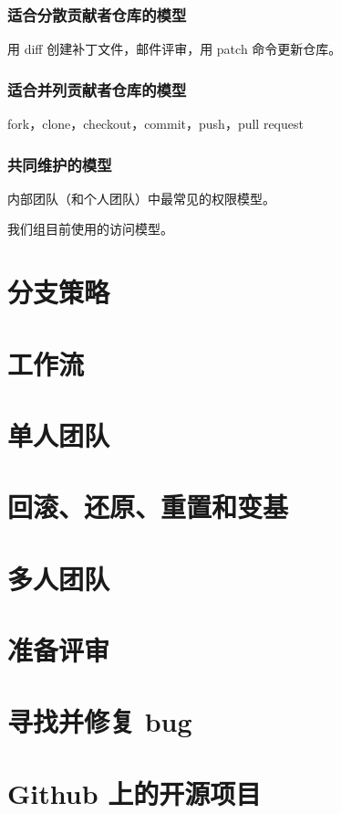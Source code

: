 \documentclass[cn,pad,11pt,green,geye]{../elegantnote}
\begin{document}
\subsubsection{适合分散贡献者仓库的模型}
用 diff 创建补丁文件，邮件评审，用 patch 命令更新仓库。

\subsubsection{适合并列贡献者仓库的模型}
fork，clone，checkout，commit，push，pull request

\subsubsection{共同维护的模型}
内部团队（和个人团队）中最常见的权限模型。

我们组目前使用的访问模型。

\section{分支策略}

\section{工作流}

\section{单人团队}

\section{回滚、还原、重置和变基}

\section{多人团队}

\section{准备评审}

\section{寻找并修复 bug}

\section{Github 上的开源项目}
\end{document}
